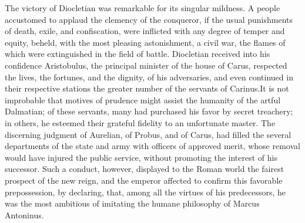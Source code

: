 The victory of Diocletian was remarkable for its singular
mildness. A people accustomed to applaud the clemency of the
conqueror, if the usual punishments of death, exile, and
confiscation, were inflicted with any degree of temper and
equity, beheld, with the most pleasing astonishment, a civil war,
the flames of which were extinguished in the field of battle.
Diocletian received into his confidence Aristobulus, the
principal minister of the house of Carus, respected the lives,
the fortunes, and the dignity, of his adversaries, and even
continued in their respective stations the greater number of the
servants of Carinus.\footnotemark[4] It is not improbable that motives of
prudence might assist the humanity of the artful Dalmatian; of
these servants, many had purchased his favor by secret treachery;
in others, he esteemed their grateful fidelity to an unfortunate
master. The discerning judgment of Aurelian, of Probus, and of
Carus, had filled the several departments of the state and army
with officers of approved merit, whose removal would have injured
the public service, without promoting the interest of his
successor. Such a conduct, however, displayed to the Roman world
the fairest prospect of the new reign, and the emperor affected
to confirm this favorable prepossession, by declaring, that,
among all the virtues of his predecessors, he was the most
ambitious of imitating the humane philosophy of Marcus Antoninus.\footnotemark[5]



